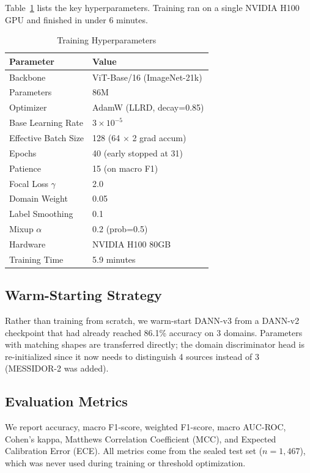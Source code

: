 \documentclass[conference]{IEEEtran}
\begin{document}
Table~\ref{tab:hyperparams} lists the key hyperparameters. Training ran on a single NVIDIA H100 GPU and finished in under 6 minutes.

\begin{table}[h]
\centering
\caption{Training Hyperparameters}
\label{tab:hyperparams}
\begin{tabular}{ll}
\toprule
\textbf{Parameter} & \textbf{Value} \\
\midrule
Backbone & ViT-Base/16 (ImageNet-21k) \\
Parameters & 86M \\
Optimizer & AdamW (LLRD, decay=0.85) \\
Base Learning Rate & $3 \times 10^{-5}$ \\
Effective Batch Size & 128 (64 $\times$ 2 grad accum) \\
Epochs & 40 (early stopped at 31) \\
Patience & 15 (on macro F1) \\
Focal Loss $\gamma$ & 2.0 \\
Domain Weight & 0.05 \\
Label Smoothing & 0.1 \\
Mixup $\alpha$ & 0.2 (prob=0.5) \\
Hardware & NVIDIA H100 80GB \\
Training Time & 5.9 minutes \\
\bottomrule
\end{tabular}
\end{table}

\subsection{Warm-Starting Strategy}

Rather than training from scratch, we warm-start DANN-v3 from a DANN-v2 checkpoint that had already reached 86.1\% accuracy on 3 domains. Parameters with matching shapes are transferred directly; the domain discriminator head is re-initialized since it now needs to distinguish 4 sources instead of 3 (MESSIDOR-2 was added).

\subsection{Evaluation Metrics}

We report accuracy, macro F1-score, weighted F1-score, macro AUC-ROC, Cohen's kappa, Matthews Correlation Coefficient (MCC), and Expected Calibration Error (ECE). All metrics come from the sealed test set ($n=1{,}467$), which was never used during training or threshold optimization.
\end{document}
